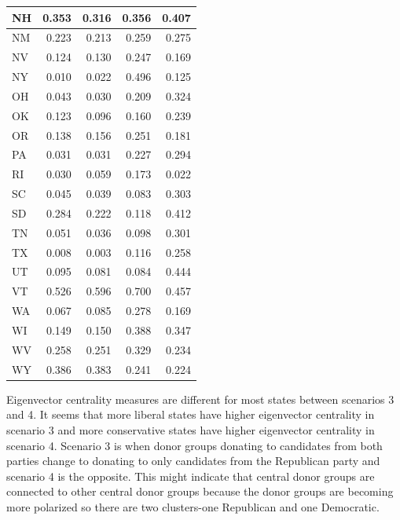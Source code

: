 \documentclass[]{article}
\begin{document}
\begin{table}[!h]
\begin{tabular}{l|r|r|r|r}
\hline
\rowcolor{gray!6}  NH & 0.353 & 0.316 & 0.356 & 0.407\\
\hline
NM & 0.223 & 0.213 & 0.259 & 0.275\\
\hline
\rowcolor{gray!6}  NV & 0.124 & 0.130 & 0.247 & 0.169\\
\hline
NY & 0.010 & 0.022 & 0.496 & 0.125\\
\hline
\rowcolor{gray!6}  OH & 0.043 & 0.030 & 0.209 & 0.324\\
\hline
OK & 0.123 & 0.096 & 0.160 & 0.239\\
\hline
\rowcolor{gray!6}  OR & 0.138 & 0.156 & 0.251 & 0.181\\
\hline
PA & 0.031 & 0.031 & 0.227 & 0.294\\
\hline
\rowcolor{gray!6}  RI & 0.030 & 0.059 & 0.173 & 0.022\\
\hline
SC & 0.045 & 0.039 & 0.083 & 0.303\\
\hline
\rowcolor{gray!6}  SD & 0.284 & 0.222 & 0.118 & 0.412\\
\hline
TN & 0.051 & 0.036 & 0.098 & 0.301\\
\hline
\rowcolor{gray!6}  TX & 0.008 & 0.003 & 0.116 & 0.258\\
\hline
UT & 0.095 & 0.081 & 0.084 & 0.444\\
\hline
\rowcolor{gray!6}  VT & 0.526 & 0.596 & 0.700 & 0.457\\
\hline
WA & 0.067 & 0.085 & 0.278 & 0.169\\
\hline
\rowcolor{gray!6}  WI & 0.149 & 0.150 & 0.388 & 0.347\\
\hline
WV & 0.258 & 0.251 & 0.329 & 0.234\\
\hline
\rowcolor{gray!6}  WY & 0.386 & 0.383 & 0.241 & 0.224\\
\hline
\end{tabular}
\end{table}

Eigenvector centrality measures are different for most states between
scenarios 3 and 4. It seems that more liberal states have higher
eigenvector centrality in scenario 3 and more conservative states have
higher eigenvector centrality in scenario 4. Scenario 3 is when donor
groups donating to candidates from both parties change to donating to
only candidates from the Republican party and scenario 4 is the
opposite. This might indicate that central donor groups are connected to
other central donor groups because the donor groups are becoming more
polarized so there are two clusters-one Republican and one Democratic.
\end{document}
